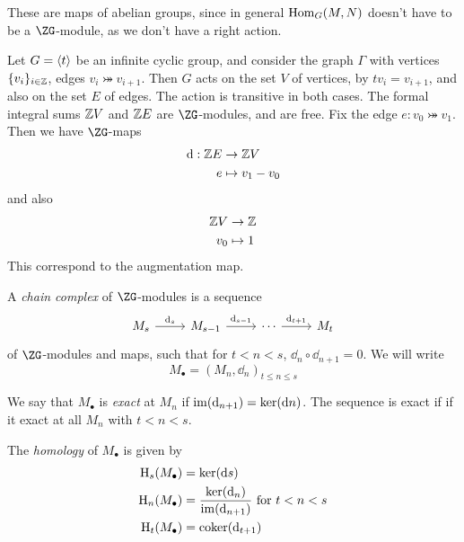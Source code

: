 \documentclass{article}
\begin{document}
These are maps of abelian groups, since in general \(\operatorname{Hom}_G(M, N)\) doesn't have to be a \(\ZG\)-module, as we don't have a right action.

\begin{example}
     Let \(G = \left\langle t \right\rangle\) be an infinite cyclic group, and consider the graph \(\Gamma\) with vertices \(\{v_i\}_{i \in \mathbb{Z}}\), edges \(v_i \bij v_{i+1}\). Then \(G\) acts on the set \(V\) of vertices, by \(t v_i = v_{i+1}\), and also on the set \(E\) of edges. The action is transitive in both cases. The formal integral sums \(\mathbb{Z} V\) and \(\mathbb{Z} E\) are \(\ZG\)-modules, and are free. Fix the edge \(e : v_0 \bij v_1\). Then we have \(\ZG\)-maps
    \begin{align*}
        \dd : \mathbb{Z} E &\to \mathbb{Z} V \\
        e &\mapsto v_1 - v_0
    \end{align*}
    and also
    \begin{align*}
        \mathbb{Z} V &\to \mathbb{Z} \\
        v_0 &\mapsto 1
    \end{align*}
    This correspond to the augmentation map.
\end{example}

\begin{definition}
    A \emph{chain complex} of \(\ZG\)-modules is a sequence
    \[\begin{tikzcd}
        {M_s} & {M_{s-1}} & \cdots & {M_t}
        \arrow["{\dd_s}", from=1-1, to=1-2]
        \arrow["{\dd_{s-1}}", from=1-2, to=1-3]
        \arrow["{\dd_{t+1}}", from=1-3, to=1-4]
    \end{tikzcd}\]
    of \(\ZG\)-modules and maps, such that for \(t < n < s\), \(\dd_n \circ \dd_{n+1} = 0\). We will write
    \[M_\bullet = (M_n, \dd_n)_{t \le n \le s}\]
\end{definition}
We say that \(M_\bullet\) is \emph{exact} at \(M_n\) if \(\operatorname{im}(\dd_{n+1}) = \ker(\dd n)\). The sequence is exact if if it exact at all \(M_n\) with \(t < n < s\).

The \emph{homology} of \(M_\bullet\) is given by
\begin{align*}
    \mathrm{H}_s(M_\bullet) &= \ker(\dd s) \\
    \mathrm{H}_n(M_\bullet) &= \frac{\ker(\dd_n)}{\operatorname{im}(\dd_{n+1})} \text{ for }t < n < s \\
    \mathrm{H}_t(M_\bullet) &= \operatorname{coker}(\dd_{t+1})
\end{align*}
\end{document}
